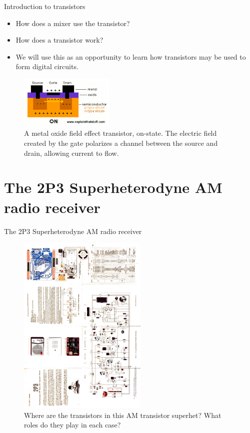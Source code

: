 \documentclass{beamer}
\begin{document}
\begin{frame}{Introduction to transistors}
\begin{itemize}
\item How does a mixer use the transistor?
\item \alert{How does a transistor work?}
\item We will use this as an opportunity to learn how transistors may be used to form digital circuits.
\end{itemize}
\begin{figure}
\centering
\includegraphics[width=0.4\textwidth]{figures/mosfet2.png}
\caption{\label{fig:mosfet2} A metal oxide field effect transistor, on-state.  The electric field created by the gate polarizes a channel between the source and drain, allowing current to flow.}
\end{figure}
\end{frame}

\section{The 2P3 Superheterodyne AM radio receiver}

\begin{frame}{The 2P3 Superheterodyne AM radio receiver}
\begin{figure}
\centering
\includegraphics[width=0.55\textwidth,angle=270,trim=10.5cm 1.75cm 0cm 9cm,clip=true]{figures/2P3.pdf}
\caption{\label{fig:2P3} Where are the transistors in this AM transistor superhet?  What roles do they play in each case?}
\end{figure}
\end{frame}
\end{document}

